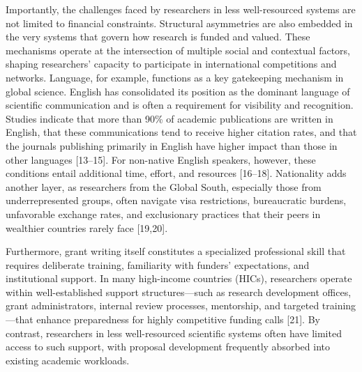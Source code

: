 \documentclass[
  letterpaper,
  DIV=11,
  numbers=noendperiod]{scrartcl}
\begin{document}
Importantly, the challenges faced by researchers in less well-resourced
systems are not limited to financial constraints. Structural asymmetries
are also embedded in the very systems that govern how research is funded
and valued. These mechanisms operate at the intersection of multiple
social and contextual factors, shaping researchers' capacity to
participate in international competitions and networks. Language, for
example, functions as a key gatekeeping mechanism in global science.
English has consolidated its position as the dominant language of
scientific communication and is often a requirement for visibility and
recognition. Studies indicate that more than 90\% of academic
publications are written in English, that these communications tend to
receive higher citation rates, and that the journals publishing
primarily in English have higher impact than those in other languages
{[}13--15{]}. For non-native English speakers, however, these conditions
entail additional time, effort, and resources {[}16--18{]}. Nationality
adds another layer, as researchers from the Global South, especially
those from underrepresented groups, often navigate visa restrictions,
bureaucratic burdens, unfavorable exchange rates, and exclusionary
practices that their peers in wealthier countries rarely face
{[}19,20{]}.

Furthermore, grant writing itself constitutes a specialized professional
skill that requires deliberate training, familiarity with funders'
expectations, and institutional support. In many high-income countries
(HICs), researchers operate within well-established support
structures---such as research development offices, grant administrators,
internal review processes, mentorship, and targeted training---that
enhance preparedness for highly competitive funding calls {[}21{]}. By
contrast, researchers in less well-resourced scientific systems often
have limited access to such support, with proposal development
frequently absorbed into existing academic workloads.
\end{document}
